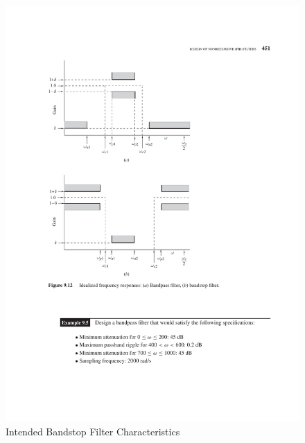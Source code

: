 \documentclass[11pt]{article}
\begin{document}
\begin{figure}[H]
    \centering
    \includegraphics[scale=0.9]{bandstop} 
    \caption{Intended Bandstop Filter Characteristics \cite{antoniou_2006}}
    \label{fig:Bandstop}
\end{figure}
\end{document}
